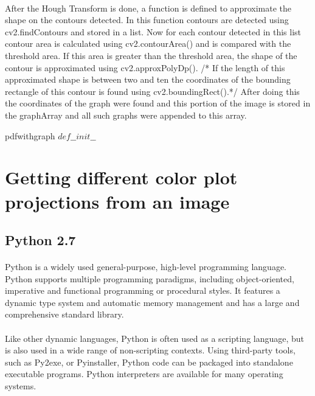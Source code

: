 \documentclass[12pts]{scrreprt}
\begin{document}
\paragraph{}
After the Hough Transform is done, a function is defined to approximate the shape on the contours detected. In this function contours are detected using cv2.findContours and stored in a list. Now for each contour detected in this list contour area is calculated using cv2.contourArea() and is compared with the threshold area. If this area is greater than the threshold area, the shape of the contour is approximated using cv2.approxPolyDp(). /* If the length of this approximated shape is between two and ten the coordinates of the bounding rectangle of this contour is found using cv2.boundingRect().*/ After doing this the coordinates of the graph were found and this portion of the image is stored in the graphArray and all such graphs were appended to this array.
\begin{pseudocode}{pdfwithgraph}
$def \_\_init\_\_$\\




\end{pseudocode}


\section{Getting different color plot projections from an image}
\subsection{Python 2.7}
\paragraph{}
Python is a widely used general-purpose, high-level programming language.
Python supports multiple programming paradigms, including object-oriented, imperative and functional programming or procedural styles. It features a dynamic type system and automatic memory management and has a large and comprehensive standard library.
\paragraph{}
Like other dynamic languages, Python is often used as a scripting language, but is also used in a wide range of non-scripting contexts. Using third-party tools, such as Py2exe, or Pyinstaller, Python code can be packaged into standalone executable programs. Python interpreters are available for many operating systems.
\end{document}
